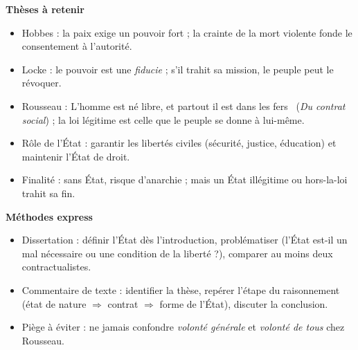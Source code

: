 \documentclass[11pt]{article}
\begin{document}
\begin{bilan}
\textbf{Thèses à retenir}
\begin{itemize}
  \item Hobbes : la paix exige un pouvoir fort ; la crainte de la mort violente fonde le consentement à l'autorité.
  \item Locke : le pouvoir est une \emph{fiducie} ; s'il trahit sa mission, le peuple peut le révoquer.
  \item Rousseau : \guillemotleft L'homme est né libre, et partout il est dans les fers \guillemotright\ (\emph{Du contrat social}) ; la loi légitime est celle que le peuple se donne à lui-même.
  \item Rôle de l'État : garantir les libertés civiles (sécurité, justice, éducation) et maintenir l'État de droit.
  \item Finalité : sans État, risque d'anarchie ; mais un État illégitime ou hors-la-loi trahit sa fin.
\end{itemize}

\textbf{Méthodes express}
\begin{itemize}
  \item Dissertation : définir l'État dès l'introduction, problématiser (l'État est-il un mal nécessaire ou une condition de la liberté ?), comparer au moins deux contractualistes.
  \item Commentaire de texte : identifier la thèse, repérer l'étape du raisonnement (état de nature $\Rightarrow$ contrat $\Rightarrow$ forme de l'État), discuter la conclusion.
  \item Piège à éviter : ne jamais confondre \emph{volonté générale} et \emph{volonté de tous} chez Rousseau.
\end{itemize}
\end{bilan}
\end{document}
